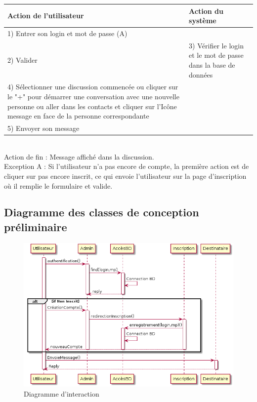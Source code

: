 \documentclass[a4paper,12pt]{article}
\begin{document}
	\begin{tabular}{|p{7cm}|p{7cm}|}
		\hline
		Action de l'utilisateur & Action du système\tabularnewline
		\hline

		\hline
		1) Entrer son login et mot de passe (A)  & \tabularnewline

		\hline
		2) Valider  & 3) Vérifier le login et le mot de passe dans la base de données\tabularnewline

		\hline
		4) Sélectionner une discussion commencée ou cliquer sur le "+" pour	démarrer une conversation avec une nouvelle personne ou aller dans les contacts et cliquer sur l’Icône message en face de la personne correspondante & \tabularnewline

		\hline
		5) Envoyer son message  & \tabularnewline
		\hline
	\end{tabular}

~\\

	Action de fin  : Message affiché dans la discussion. \\

	Exception A : Si l'utilisateur n'a pas encore de compte, la première action est de cliquer sur pas encore inscrit, ce qui envoie l'utilisateur sur la page d'inscription où il remplie le formulaire et valide.

	\subsection{Diagramme des classes de conception préliminaire}
	\begin{figure}[H]
		\centerline{\includegraphics[width=12.5cm]{../diagrammes/img/interaction.png}}
		\caption{Diagramme d’interaction}
	\end{figure}
\end{document}
